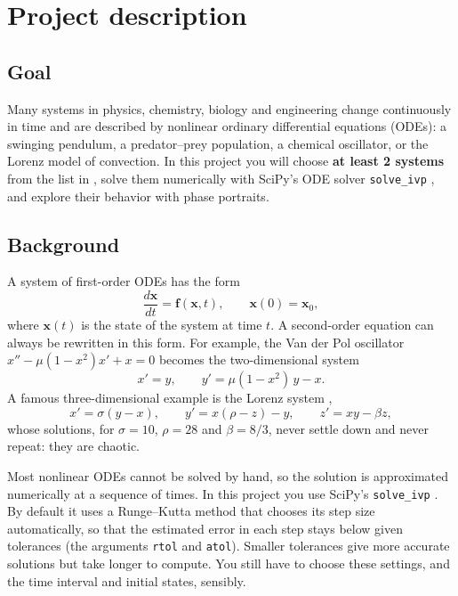 \documentclass[11pt,a4paper]{article}
\begin{document}
\section*{Project description}

\subsection*{Goal}
Many systems in physics, chemistry, biology and engineering change
continuously in time and are described by nonlinear ordinary differential
equations (ODEs): a swinging pendulum, a predator--prey population, a chemical
oscillator, or the Lorenz model of convection. In this project you will choose
\textbf{at least 2 systems} from the list in \cite{list}, solve them
numerically with SciPy's ODE solver \texttt{solve\_ivp} \cite{scipy}, and
explore their behavior with phase portraits.

\subsection*{Background}
A system of first-order ODEs has the form
\begin{equation*}
  \frac{d\mathbf{x}}{dt} = \mathbf{f}(\mathbf{x}, t), \qquad
  \mathbf{x}(0) = \mathbf{x}_0,
\end{equation*}
where $\mathbf{x}(t)$ is the state of the system at time $t$. A second-order
equation can always be rewritten in this form. For example, the Van der Pol
oscillator $x'' - \mu(1 - x^2)x' + x = 0$ becomes the two-dimensional system
\begin{equation*}
  x' = y, \qquad y' = \mu(1 - x^2)\,y - x .
\end{equation*}
A famous three-dimensional example is the Lorenz system \cite{lorenz},
\begin{equation*}
  x' = \sigma(y - x), \qquad y' = x(\rho - z) - y, \qquad z' = xy - \beta z,
\end{equation*}
whose solutions, for $\sigma = 10$, $\rho = 28$ and $\beta = 8/3$, never settle
down and never repeat: they are chaotic.

Most nonlinear ODEs cannot be solved by hand, so the solution is approximated
numerically at a sequence of times. In this project you use SciPy's
\texttt{solve\_ivp} \cite{scipy}. By default it uses a Runge--Kutta method
that chooses its step size automatically, so that the estimated error in each
step stays below given tolerances (the arguments \texttt{rtol} and
\texttt{atol}). Smaller tolerances give more accurate solutions but take
longer to compute. You still have to choose these settings, and the time
interval and initial states, sensibly.
\end{document}
